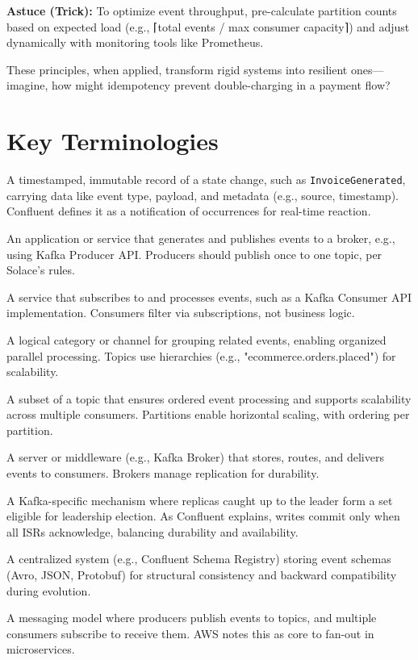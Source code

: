 \documentclass[12pt,a4paper]{report}
\begin{document}
\begin{framed}
\textbf{Astuce (Trick):} To optimize event throughput, pre-calculate partition counts based on expected load (e.g., ⌈total events / max consumer capacity⌉) and adjust dynamically with monitoring tools like Prometheus.
\end{framed}

These principles, when applied, transform rigid systems into resilient ones—imagine, how might idempotency prevent double-charging in a payment flow?

\section{Key Terminologies}
\begin{description}[style=nextline]
    \item[Event:] A timestamped, immutable record of a state change, such as \texttt{InvoiceGenerated}, carrying data like event type, payload, and metadata (e.g., source, timestamp). Confluent defines it as a notification of occurrences for real-time reaction.
    \item[Producer:] An application or service that generates and publishes events to a broker, e.g., using Kafka Producer API. Producers should publish once to one topic, per Solace's rules.
    \item[Consumer:] A service that subscribes to and processes events, such as a Kafka Consumer API implementation. Consumers filter via subscriptions, not business logic.
    \item[Topic:] A logical category or channel for grouping related events, enabling organized parallel processing. Topics use hierarchies (e.g., "ecommerce.orders.placed") for scalability.
    \item[Partition:] A subset of a topic that ensures ordered event processing and supports scalability across multiple consumers. Partitions enable horizontal scaling, with ordering per partition.
    \item[Broker:] A server or middleware (e.g., Kafka Broker) that stores, routes, and delivers events to consumers. Brokers manage replication for durability.
    \item[ISR (In-Sync Replica):] A Kafka-specific mechanism where replicas caught up to the leader form a set eligible for leadership election. As Confluent explains, writes commit only when all ISRs acknowledge, balancing durability and availability.
    \item[Schema Registry:] A centralized system (e.g., Confluent Schema Registry) storing event schemas (Avro, JSON, Protobuf) for structural consistency and backward compatibility during evolution.
    \item[Pub/Sub Pattern:] A messaging model where producers publish events to topics, and multiple consumers subscribe to receive them. AWS notes this as core to fan-out in microservices.
\end{description}
\end{document}
